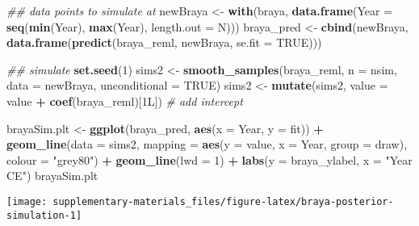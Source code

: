 \documentclass[12pt,]{article}
\newenvironment{Shaded}{\begin{snugshade}}{\end{snugshade}}
\newcommand{\CommentTok}[1]{\textcolor[rgb]{0.56,0.35,0.01}{\textit{#1}}}
\newcommand{\DataTypeTok}[1]{\textcolor[rgb]{0.13,0.29,0.53}{#1}}
\newcommand{\DecValTok}[1]{\textcolor[rgb]{0.00,0.00,0.81}{#1}}
\newcommand{\KeywordTok}[1]{\textcolor[rgb]{0.13,0.29,0.53}{\textbf{#1}}}
\newcommand{\NormalTok}[1]{#1}
\newcommand{\OperatorTok}[1]{\textcolor[rgb]{0.81,0.36,0.00}{\textbf{#1}}}
\newcommand{\OtherTok}[1]{\textcolor[rgb]{0.56,0.35,0.01}{#1}}
\newcommand{\StringTok}[1]{\textcolor[rgb]{0.31,0.60,0.02}{#1}}
\begin{document}
\begin{Shaded}
\begin{Highlighting}[]
\CommentTok{## data points to simulate at}
\NormalTok{newBraya <-}\StringTok{ }\KeywordTok{with}\NormalTok{(braya,}
                 \KeywordTok{data.frame}\NormalTok{(}\DataTypeTok{Year =} \KeywordTok{seq}\NormalTok{(}\KeywordTok{min}\NormalTok{(Year), }\KeywordTok{max}\NormalTok{(Year),}
                                       \DataTypeTok{length.out =}\NormalTok{ N)))}
\NormalTok{braya_pred <-}\StringTok{ }\KeywordTok{cbind}\NormalTok{(newBraya,}
                    \KeywordTok{data.frame}\NormalTok{(}\KeywordTok{predict}\NormalTok{(braya_reml, newBraya,}
                                       \DataTypeTok{se.fit =} \OtherTok{TRUE}\NormalTok{)))}

\CommentTok{## simulate}
\KeywordTok{set.seed}\NormalTok{(}\DecValTok{1}\NormalTok{)}
\NormalTok{sims2 <-}\StringTok{ }\KeywordTok{smooth_samples}\NormalTok{(braya_reml, }\DataTypeTok{n =}\NormalTok{ nsim, }\DataTypeTok{data =}\NormalTok{ newBraya,}
    \DataTypeTok{unconditional =} \OtherTok{TRUE}\NormalTok{)}
\NormalTok{sims2 <-}\StringTok{ }\KeywordTok{mutate}\NormalTok{(sims2, }\DataTypeTok{value =}\NormalTok{ value }\OperatorTok{+}\StringTok{ }\KeywordTok{coef}\NormalTok{(braya_reml)[1L]) }\CommentTok{# add intercept}

\NormalTok{brayaSim.plt <-}\StringTok{ }\KeywordTok{ggplot}\NormalTok{(braya_pred, }\KeywordTok{aes}\NormalTok{(}\DataTypeTok{x =}\NormalTok{ Year, }\DataTypeTok{y =}\NormalTok{ fit)) }\OperatorTok{+}
\StringTok{    }\KeywordTok{geom_line}\NormalTok{(}\DataTypeTok{data =}\NormalTok{ sims2,}
              \DataTypeTok{mapping =} \KeywordTok{aes}\NormalTok{(}\DataTypeTok{y =}\NormalTok{ value, }\DataTypeTok{x =}\NormalTok{ Year, }\DataTypeTok{group =}\NormalTok{ draw),}
              \DataTypeTok{colour =} \StringTok{"grey80"}\NormalTok{) }\OperatorTok{+}
\StringTok{    }\KeywordTok{geom_line}\NormalTok{(}\DataTypeTok{lwd =} \DecValTok{1}\NormalTok{) }\OperatorTok{+}
\StringTok{    }\KeywordTok{labs}\NormalTok{(}\DataTypeTok{y =}\NormalTok{ braya_ylabel, }\DataTypeTok{x =} \StringTok{"Year CE"}\NormalTok{)}
\NormalTok{brayaSim.plt}
\end{Highlighting}
\end{Shaded}

\begin{center}\texttt{[image: supplementary-materials\_files/figure-latex/braya-posterior-simulation-1]} \end{center}
\end{document}

